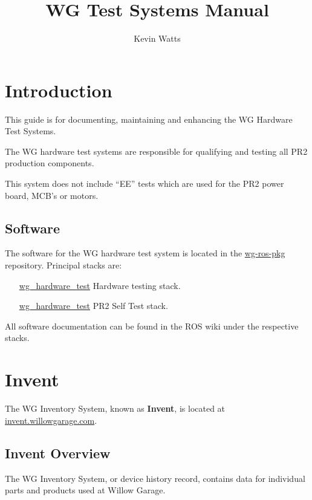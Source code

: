 \documentclass[11pt]{book}
\begin{document}
\title{WG Test Systems Manual}
\author{Kevin Watts}
\newcommand{\TODO}[1]{\textcolor{red}{TODO: #1}}
\maketitle

\tableofcontents
\newpage


\chapter {Introduction}

This guide is for documenting, maintaining and enhancing the WG Hardware Test Systems. 

The WG hardware test systems are responsible for qualifying and testing all PR2 production components.

This system does not include ``EE'' tests which are used for the PR2 power board, MCB's or motors.


\section {Software}

The software for the WG hardware test system is located in the \href{http://code.ros.org}{wg-ros-pkg} repository. Principal stacks are:
\begin{itemize}
\item [\href{http://www.ros.org/wiki/wg\_hardware\_test}{wg\_hardware\_test}] Hardware testing stack.
\item [\href{http://www.ros.org/wiki/wg\_hardware\_test}{wg\_hardware\_test}] PR2 Self Test stack.
\end{itemize}

All software documentation can be found in the ROS wiki under the respective stacks.

\chapter {Invent}

The WG Inventory System, known as {\bf Invent}, is located at \href{http://invent.willowgarage.com}{invent.willowgarage.com}. 

\section{Invent Overview}
The WG Inventory System, or device history record, contains data for individual parts and products used at Willow Garage. 
\end{document}
